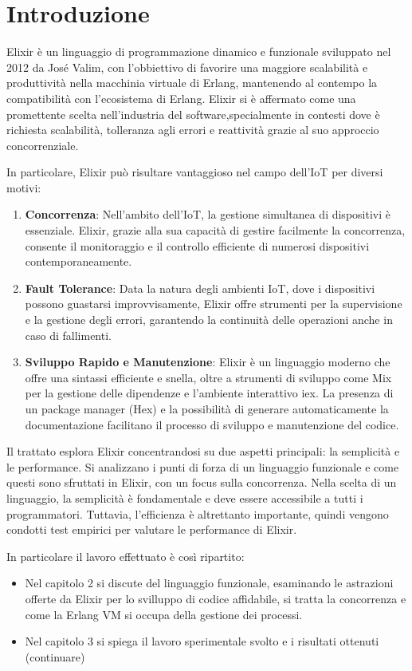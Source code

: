 \chapter{Introduzione}

Elixir è un linguaggio di programmazione dinamico e funzionale
sviluppato nel 2012 da José Valim,
con l'obbiettivo di favorire una maggiore scalabilità
e produttività nella macchinia virtuale di Erlang,
mantenendo al contempo la compatibilità con l'ecosistema
di Erlang\cite{Elixirpr12:online}.
Elixir si è affermato come una promettente scelta
nell'industria del software,specialmente in contesti dove è
richiesta scalabilità, tolleranza agli errori e reattività 
grazie al suo approccio concorrenziale.


In particolare, Elixir può risultare vantaggioso nel campo dell'IoT per diversi motivi:
\begin{enumerate}
	\item \textbf{Concorrenza}: Nell'ambito dell'IoT, la gestione simultanea
	di dispositivi è essenziale. Elixir, grazie alla sua capacità 
	di gestire facilmente la concorrenza, consente il monitoraggio
	e il controllo efficiente di numerosi dispositivi contemporaneamente.
	\item \textbf{Fault Tolerance}: 
	Data la natura degli ambienti IoT, dove i dispositivi possono
	guastarsi improvvisamente, Elixir offre strumenti per la supervisione
	e la gestione degli errori, garantendo la continuità delle operazioni
	anche in caso di fallimenti.
	\item \textbf{Sviluppo Rapido e Manutenzione}:
	Elixir è un linguaggio moderno che offre una sintassi efficiente e snella,
	oltre a strumenti di sviluppo come Mix per la gestione delle dipendenze
	e l'ambiente interattivo iex. La presenza di un package manager (Hex)\cite{Hex63:online}
	e la possibilità di generare automaticamente la documentazione
	facilitano il processo di sviluppo e manutenzione del codice.
	
\end{enumerate}

Il trattato esplora Elixir concentrandosi su due aspetti principali:
la semplicità e le performance. Si analizzano i punti di forza di 
un linguaggio funzionale e come questi sono sfruttati in Elixir, con 
un focus sulla concorrenza. Nella scelta di un linguaggio, la semplicità
è fondamentale e deve essere accessibile a tutti i programmatori.
Tuttavia, l'efficienza è altrettanto importante, quindi vengono condotti
test empirici per valutare le performance di Elixir.

In particolare il lavoro effettuato è così ripartito: 


\begin{itemize}
	\item Nel capitolo 2 si discute del linguaggio funzionale,
	esaminando le astrazioni offerte da Elixir per lo svilluppo
	di codice affidabile, si tratta la concorrenza e come la Erlang VM
	si occupa della gestione dei processi.
	\item Nel capitolo 3 si spiega il lavoro sperimentale svolto e i risultati
	ottenuti (continuare)

\end{itemize}


